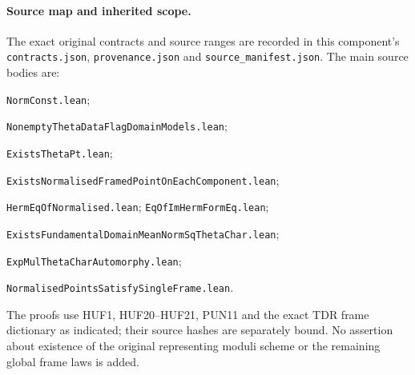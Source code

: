 \paragraph{Source map and inherited scope.}
The exact original contracts and source ranges are recorded in
this component's \texttt{contracts.json}, \texttt{provenance.json}
and \texttt{source\_manifest.json}.
The main source bodies are:\par
\noindent\texttt{NormConst.lean};\par
\noindent\texttt{NonemptyThetaDataFlagDomainModels.lean};\par
\noindent\texttt{ExistsThetaPt.lean};\par
\noindent\texttt{ExistsNormalisedFramedPointOnEachComponent.lean};\par
\noindent\texttt{HermEqOfNormalised.lean};
\texttt{EqOfImHermFormEq.lean};\par
\noindent\texttt{ExistsFundamentalDomainMeanNormSqThetaChar.lean};\par
\noindent\texttt{ExpMulThetaCharAutomorphy.lean};\par
\noindent\texttt{NormalisedPointsSatisfySingleFrame.lean}.\par
The proofs use HUF1, HUF20--HUF21, PUN11 and the exact TDR
frame dictionary as indicated; their source hashes are separately
bound.  No assertion about existence of the original representing
moduli scheme or the remaining global frame laws is added.
